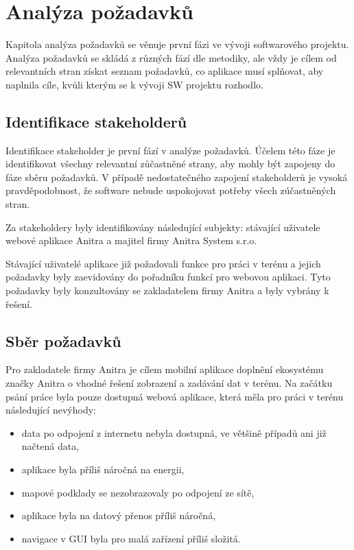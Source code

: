 
\chapter{Analýza požadavků}

Kapitola analýza požadavků se věnuje první fázi ve vývoji softwarového projektu. Analýza požadavků se skládá z různých fází dle metodiky, ale vždy je cílem od relevantních stran získat seznam požadavků, co aplikace musí splňovat, aby naplnila cíle, kvůli kterým se k vývoji SW projektu rozhodlo.


\section{Identifikace stakeholderů}

Identifikace stakeholder je první fází v analýze požadavků. Účelem této fáze je identifikovat všechny relevantní zůčastněné strany, aby mohly být zapojeny do fáze sběru požadavků. V případě nedostatečného zapojení stakeholderů je vysoká pravděpodobnost, že software nebude uspokojovat potřeby všech zúčastněných stran.

Za stakeholdery byly identifikovány následující subjekty: stávající uživatele webové aplikace Anitra a majitel firmy Anitra System s.r.o. 

Stávající uživatelé aplikace již požadovali funkce pro práci v terénu a jejich požadavky byly zaevidovány do pořadníku funkcí pro webovou aplikaci. Tyto požadavky byly konzultovány se zakladatelem firmy Anitra a byly vybrány k řešení.

\section{Sběr požadavků}

Pro zakladatele firmy Anitra je cílem mobilní aplikace doplnění ekosystému značky Anitra o vhodné řešení zobrazení a zadávání dat v terénu. Na začátku psání práce byla pouze dostupná webová aplikace, která měla pro práci v terénu následující nevýhody:

\begin{itemize}
	\item data po odpojení z internetu nebyla dostupná, ve většině případů ani již načtená data,
	\item aplikace byla příliš náročná na energii,
	\item mapové podklady se nezobrazovaly po odpojení ze sítě,
	\item aplikace byla na datový přenos příliš náročná,
	\item navigace v GUI byla pro malá zařízení příliš složitá.
\end{itemize}

